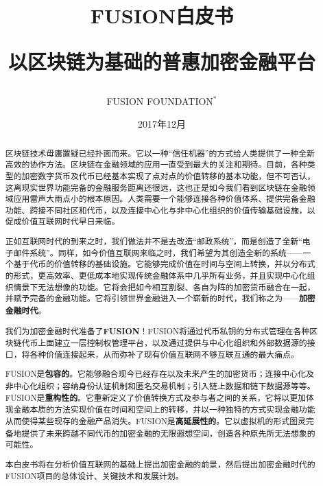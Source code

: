 \documentclass[a4paper,12pt]{article}
\begin{document}
\title{\color{black} FUSION白皮书 \\ [2ex] \begin{large}以区块链为基础的普惠加密金融平台\end{large}
}
\author{FUSION FOUNDATION$^*$}

\date{2017年12月}
\renewcommand{\thefootnote}{\fnsymbol{footnote}}
\singlespacing
\maketitle
\thispagestyle{empty}

\vspace{-.2in}

\renewcommand\abstractname{\large{摘要}}
\begin{abstract}
  \noindent

区块链技术毋庸置疑已经扑面而来。它以一种“信任机器”的方式给人类提供了一种全新高效的协作方法。区块链在金融领域的应用一直受到最大的关注和期待。目前，各种类型的加密数字货币及代币已经基本实现了点对点的价值转移的基本功能，但不可否认，这离现实世界功能完备的金融服务距离还很远，这也正是如今我们看到区块链在金融领域应用雷声大雨点小的根本原因。人类需要一个能够连接各种价值体系、提供完备金融功能、跨接不同社区和代币，以及连接中心化与非中心化组织的价值传输基础设施，以促成价值互联网时代早日来临。

正如互联网时代的到来之时，我们做法并不是去改造“邮政系统”，而是创造了全新“电子邮件系统”。同样，如今价值互联网来临之时，我们希望为其创造全新的系统——一个基于代币的价值转移的基础设施。它能够完成价值在时间与空间上转换，并以分布式的形式，更高效率、更低成本地实现传统金融体系中几乎所有业务，并且实现中心化组织情景下无法想像的功能。它将会把如今相互割裂、各自为阵的加密货币融合在一起，并赋予完备的金融功能。它将引领世界金融进入一个崭新的时代，我们称之为——\textbf{加密金融时代}。

我们为加密金融时代准备了\textbf{FUSION}！FUSION将通过代币私钥的分布式管理在各种区块链代币上面建立一层控制权管理平台，以及通过提供与中心化组织和外部数据源的接口，将各种价值连接起来，从而弥补了现有价值互联网不够互联互通的最大痛点。

FUSION是\textbf{包容的}。它能够融合现今已经存在以及未来产生的加密货币；连接中心化及非中心化组织；容纳身份认证机制和匿名交易机制；引入链上数据和链下数据源等等。FUSION是\textbf{重构性的}。它重新定义了价值转换方式及参与者之间的关系，它将以更加体现金融本质的方法实现价值在时间和空间上的转移，并以一种独特的方式实现金融功能从而使得某些现存的金融产品消失。FUSION是\textbf{高延展性的}。它以虚拟机的形式图灵完备地提供了未来跨越不同代币的加密金融的无限遐想空间，创造各种原先所无法想象的可能性。

本白皮书将在分析价值互联网的基础上提出加密金融的前景，然后提出加密金融时代的FUSION项目的总体设计、关键技术和发展计划。

\end{abstract}
\end{document}
